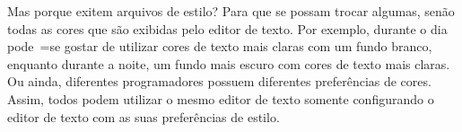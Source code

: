 Mas porque exitem arquivos de estilo?
Para que se possam trocar algumas,
senão todas as cores que são exibidas pelo editor de texto.
Por exemplo,
durante o dia pode~=se gostar de utilizar cores de texto mais claras com um fundo branco,
enquanto durante a noite,
um fundo mais escuro com cores de texto mais claras.
Ou ainda,
diferentes programadores possuem diferentes preferências de cores.
Assim,
todos podem utilizar o mesmo editor de texto somente configurando o editor de texto com as suas preferências de estilo.


